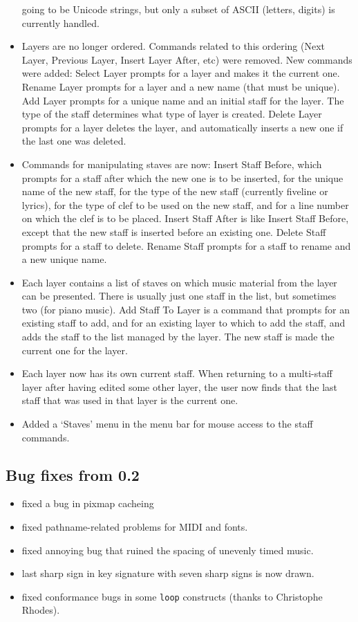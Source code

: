 \begin{itemize}
  going to be Unicode strings, but only a subset of ASCII (letters,
  digits) is currently handled.
\item Layers are no longer ordered.  Commands related to this ordering
  (Next Layer, Previous Layer, Insert Layer After, etc) were removed.
  New commands were added: Select Layer prompts for a layer and makes
  it the current one. Rename Layer prompts for a layer and a new name
  (that must be unique). Add Layer prompts for a unique name and an
  initial staff for the layer.  The type of the staff determines what
  type of layer is created.  Delete Layer prompts for a layer 
  deletes the layer, and automatically inserts a new one if the last
  one was deleted. 
\item Commands for manipulating staves are now: Insert Staff Before,
  which prompts for a staff after which the new one is to be inserted,
  for the unique name of the new staff, for the type of the new staff
  (currently fiveline or lyrics), for the type of clef to be used on
  the new staff, and for a line number on which the clef is to be
  placed.  Insert Staff After is like Insert Staff Before, except that
  the new staff is inserted before an existing one.  Delete Staff
  prompts for a staff to delete. Rename Staff prompts for a staff to
  rename and a new unique name. 
\item Each layer contains a list of staves on which music material
  from the layer can be presented.  There is usually just one staff in
  the list, but sometimes two (for piano music).  Add Staff To Layer
  is a command that prompts for an existing staff to add, and for an 
  existing layer to which to add the staff, and adds the staff to the
  list managed by the layer.  The new staff is made the current one
  for the layer. 
\item Each layer now has its own current staff.  When returning to a
  multi-staff layer after having edited some other layer, the user now
  finds that the last staff that was used in that layer is the current
  one. 
\item Added a `Staves' menu in the menu bar for mouse access to the
  staff commands. 
\end{itemize}

\subsection{Bug fixes from 0.2}

\begin{itemize}
\item fixed a bug in pixmap cacheing
\item fixed pathname-related problems for MIDI and fonts. 
\item fixed annoying bug that ruined the spacing of unevenly timed
  music. 
\item last sharp sign in key signature with seven sharp signs is now
  drawn. 
\item fixed conformance bugs in some \texttt{loop} constructs (thanks to
  Christophe Rhodes).
\end{itemize}

